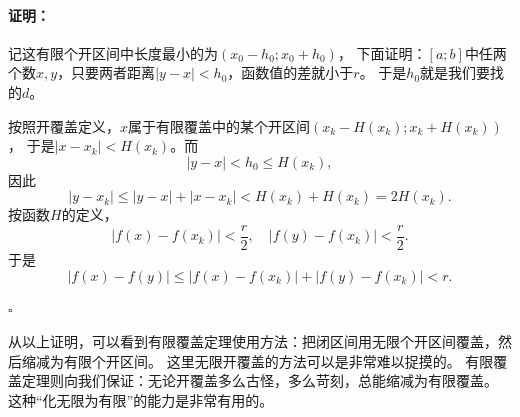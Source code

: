 \documentclass[12pt,UTF8]{ctexbook}
\renewenvironment{proof}{\paragraph{\textbf{证明：}}}{\hfill$\square$}
\begin{document}
\begin{appendix}
\begin{proof}
    记这有限个开区间中长度最小的为$(x_0 - h_0; x_0 + h_0)$，
    下面证明：$[a; b]$中任两个数$x,y$，只要两者距离$|y - x| < h_0$，函数值的差就小于$r$。
    于是$h_0$就是我们要找的$d$。

    按照开覆盖定义，$x$属于有限覆盖中的某个开区间$(x_k - H(x_k); x_k + H(x_k))$，
    于是$|x - x_k| < H(x_k)$。而
    $$|y - x| < h_0 \leqslant H(x_k),$$
    因此
    $$|y - x_k| \leqslant |y - x| + |x - x_k| < H(x_k) + H(x_k) = 2H(x_k).$$
    按函数$H$的定义，
    $$ |f(x) - f(x_k)| < \frac{r}{2}, \quad |f(y) - f(x_k)| < \frac{r}{2}. $$
    于是
    $$ |f(x) - f(y)| \leqslant |f(x) - f(x_k)| + |f(y) - f(x_k)| < r. $$

\end{proof}

从以上证明，可以看到有限覆盖定理使用方法：把闭区间用无限个开区间覆盖，然后缩减为有限个开区间。
这里无限开覆盖的方法可以是非常难以捉摸的。
有限覆盖定理则向我们保证：无论开覆盖多么古怪，多么苛刻，总能缩减为有限覆盖。
这种“化无限为有限”的能力是非常有用的。

\end{appendix}
\end{document}
